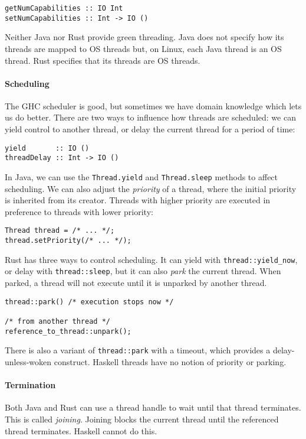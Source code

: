 \begin{verbatim}
getNumCapabilities :: IO Int
setNumCapabilities :: Int -> IO ()
\end{verbatim}

Neither Java nor Rust provide green threading.  Java does not specify
how its threads are mapped to OS threads but, on Linux, each Java
thread is an OS thread.  Rust specifies that its threads are OS
threads.

\paragraph{Scheduling}
The GHC scheduler is good, but sometimes we have domain knowledge which lets us
do better.  There are two ways to influence how threads are scheduled: we can
yield control to another thread, or delay the current thread for a period of
time:

\begin{verbatim}
yield       :: IO ()
threadDelay :: Int -> IO ()
\end{verbatim}

In Java, we can use the \verb|Thread.yield| and \verb|Thread.sleep|
methods to affect scheduling.  We can also adjust the \emph{priority}
of a thread, where the initial priority is inherited from its creator.
Threads with higher priority are executed in preference to threads
with lower priority:

\begin{verbatim}
Thread thread = /* ... */;
thread.setPriority(/* ... */);
\end{verbatim}

Rust has three ways to control scheduling.  It can yield with
\verb|thread::yield_now|, or delay with \verb|thread::sleep|, but it
can also \emph{park} the current thread.  When parked, a thread will
not execute until it is unparked by another thread.

\begin{verbatim}
thread::park() /* execution stops now */

/* from another thread */
reference_to_thread::unpark();
\end{verbatim}

There is also a variant of \verb|thread::park| with a timeout, which
provides a delay-unless-woken construct.  Haskell threads have no
notion of priority or parking.

\paragraph{Termination}
Both Java and Rust can use a thread handle to wait until that thread
terminates.  This is called \emph{joining}.  Joining blocks the
current thread until the referenced thread terminates.  Haskell cannot
do this.

